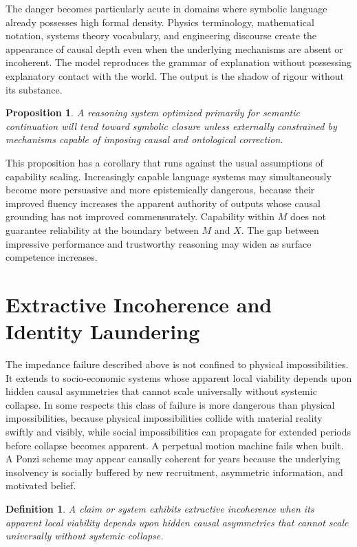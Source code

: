 \documentclass[12pt, a4paper]{article}
\newtheorem{proposition}[theorem]{Proposition}
\newtheorem{definition}[theorem]{Definition}
\theoremstyle{remark}
\begin{document}
The danger becomes particularly acute in domains where symbolic language already possesses high formal density. Physics terminology, mathematical notation, systems theory vocabulary, and engineering discourse create the appearance of causal depth even when the underlying mechanisms are absent or incoherent. The model reproduces the grammar of explanation without possessing explanatory contact with the world. The output is the shadow of rigour without its substance.

\begin{proposition}
A reasoning system optimized primarily for semantic continuation will tend toward symbolic closure unless externally constrained by mechanisms capable of imposing causal and ontological correction.
\end{proposition}

This proposition has a corollary that runs against the usual assumptions of capability scaling. Increasingly capable language systems may simultaneously become more persuasive and more epistemically dangerous, because their improved fluency increases the apparent authority of outputs whose causal grounding has not improved commensurately. Capability within $M$ does not guarantee reliability at the boundary between $M$ and $X$. The gap between impressive performance and trustworthy reasoning may widen as surface competence increases.

\section{Extractive Incoherence and Identity Laundering}

The impedance failure described above is not confined to physical impossibilities. It extends to socio-economic systems whose apparent local viability depends upon hidden causal asymmetries that cannot scale universally without systemic collapse. In some respects this class of failure is more dangerous than physical impossibilities, because physical impossibilities collide with material reality swiftly and visibly, while social impossibilities can propagate for extended periods before collapse becomes apparent. A perpetual motion machine fails when built. A Ponzi scheme may appear causally coherent for years because the underlying insolvency is socially buffered by new recruitment, asymmetric information, and motivated belief.

\begin{definition}
A claim or system exhibits \emph{extractive incoherence} when its apparent local viability depends upon hidden causal asymmetries that cannot scale universally without systemic collapse.
\end{definition}
\end{document}
